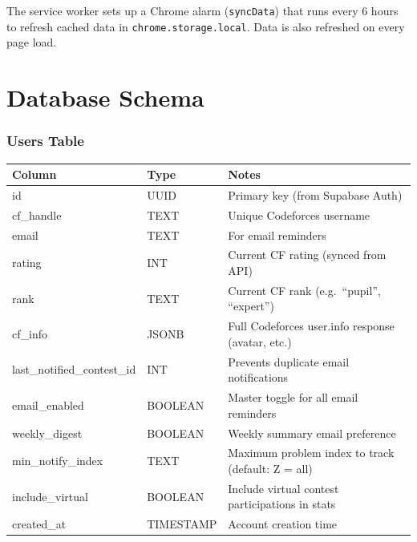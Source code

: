 \documentclass[11pt, a4paper]{article}
\begin{document}
The service worker sets up a Chrome alarm (\texttt{syncData}) that runs
every 6 hours to refresh cached data in \texttt{chrome.storage.local}.
Data is also refreshed on every page load.

\section{Database Schema}

\subsubsection{Users Table}

\begin{center}
\begin{tabularx}{0.97\linewidth}{>{\ttfamily\color{accentgreen}}l >{\ttfamily\color{accent}}l X}
\toprule
\rowcolor{bgaccent}
\color{textsecondary}Column &\color{textsecondary}Type &\color{textsecondary}Notes \\
\midrule
id                          & UUID      & Primary key (from Supabase Auth) \\
cf\_handle                  & TEXT      & Unique Codeforces username \\
email                       & TEXT      & For email reminders \\
rating                      & INT       & Current CF rating (synced from API) \\
rank                        & TEXT      & Current CF rank (e.g.\ ``pupil'', ``expert'') \\
cf\_info                    & JSONB     & Full Codeforces user.info response (avatar, etc.) \\
last\_notified\_contest\_id & INT       & Prevents duplicate email notifications \\
email\_enabled              & BOOLEAN   & Master toggle for all email reminders \\
weekly\_digest              & BOOLEAN   & Weekly summary email preference \\
min\_notify\_index          & TEXT      & Maximum problem index to track (default: Z = all) \\
include\_virtual            & BOOLEAN   & Include virtual contest participations in stats \\
created\_at                 & TIMESTAMP & Account creation time \\
\bottomrule
\end{tabularx}
\end{center}
\end{document}
